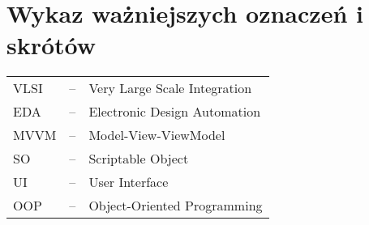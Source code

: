 \section*{Wykaz ważniejszych oznaczeń i skrótów}
\label{sec:oznaczenia_i_skroty}
\begin{tabular}{l l l}
    \footnotesize VLSI & -- & \footnotesize Very Large Scale Integration \\
    \footnotesize EDA & -- & \footnotesize Electronic Design Automation \\
    \footnotesize MVVM & -- & \footnotesize Model-View-ViewModel \\
    \footnotesize SO & -- & \footnotesize Scriptable Object \\
    \footnotesize UI & -- & \footnotesize User Interface \\
    \footnotesize OOP & -- & \footnotesize Object-Oriented Programming \\
\end{tabular}
    